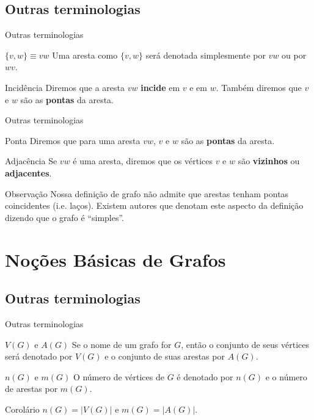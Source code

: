 \documentclass[xcolor=dvipsnames,table]{beamer}
\begin{document}
	\subsection{Outras terminologias}
	\begin{frame}{Outras terminologias}
		\begin{block}{$\{v,w\} \equiv vw$}
			Uma aresta como $\{v,w\}$ será denotada simplesmente por $vw$ ou por $wv$.
		\end{block}
		
		\begin{block}{Incidência}
			Diremos que a aresta $vw$ {\bf incide} em $v$ e em $w$. Também diremos que $v$ e $w$ são as {\bf pontas} da aresta.
		\end{block}
	\end{frame}
	
	\begin{frame}{Outras terminologias}
		\begin{block}{Ponta}
			Diremos que para uma aresta $vw$, $v$ e $w$ são as {\bf pontas} da aresta.
		\end{block}
		
		\begin{block}{Adjacência}
			Se $vw$ é uma aresta, diremos que os vértices $v$ e $w$ são {\bf vizinhos} ou {\bf adjacentes}.
		\end{block}
		
		\begin{block}{Observação}
			Nossa definição de grafo não admite que arestas tenham pontas coincidentes (i.e. laços). Existem autores que denotam este aspecto da definição dizendo que o grafo é ``simples''.
		\end{block}
	\end{frame}
	
	\section{Noções Básicas de Grafos}
	\subsection{Outras terminologias}
	\begin{frame}{Outras terminologias}
		\begin{block}{$V(G)$ e $A(G)$}
			Se o nome de um grafo for $G$, então o conjunto de seus vértices será denotado por $V(G)$ e o conjunto de suas arestas por $A(G)$.
		\end{block}
		\pause
		\begin{block}{$n(G)$ e $m(G)$}
			O número de vértices de $G$ é denotado por $n(G)$ e o número de arestas por $m(G)$. 
		\end{block}
		\pause
		\begin{block}{Corolário}
			$n(G) = |V(G)|$ e $m(G) = |A(G)|$.
		\end{block}
	\end{frame}
	
\end{document}
